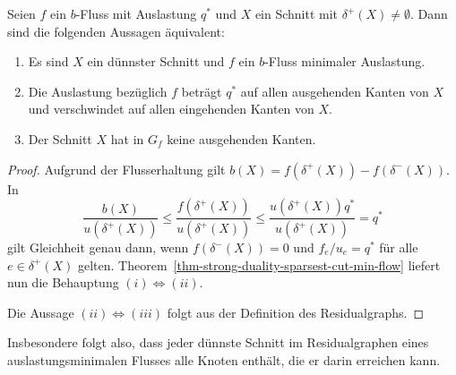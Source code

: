\begin{corollary}\label{cor-easy-characterization-sparsest-cut}
	Seien $f$ ein $b$-Fluss mit Auslastung $q^*$ und $X$ ein Schnitt mit $\delta^+(X)\neq \emptyset$.
	Dann sind die folgenden Aussagen äquivalent:
	\begin{enumerate}[label=(\roman*)]
		\item Es sind $X$ ein dünnster Schnitt und $f$ ein $b$-Fluss minimaler Auslastung.
		\item Die Auslastung bezüglich $f$ beträgt $q^*$ auf allen ausgehenden Kanten von $X$ und verschwindet auf allen eingehenden Kanten von $X$.
		\item Der Schnitt $X$ hat in $G_f$ keine ausgehenden Kanten.
	\end{enumerate}
\end{corollary}
\begin{proof}
	Aufgrund der Flusserhaltung gilt $b(X) = f(\delta^+(X)) - f(\delta^-(X))$.
	In \[
	\frac{b(X)}{u(\delta^+(X))} \leq \frac{f(\delta^+(X))}{u(\delta^+(X))} \leq \frac{u(\delta^+(X)) q^*}{u(\delta^+(X))} = q^*
	\]
	gilt Gleichheit genau dann, wenn $f(\delta^-(X))=0$ und $f_{e}/u_{e} = q^*$ für alle $e\in\delta^+(X)$ gelten.
	Theorem~\ref{thm-strong-duality-sparsest-cut-min-flow} liefert nun die Behauptung $(i)\Leftrightarrow (ii)$.
	
	Die Aussage $(ii) \Leftrightarrow (iii)$ folgt aus der Definition des Residualgraphs.
\end{proof}

Insbesondere folgt also, dass jeder dünnste Schnitt im Residualgraphen eines auslastungsminimalen Flusses alle Knoten enthält, die er darin erreichen kann.

